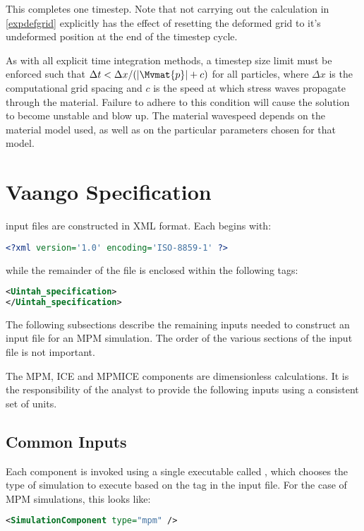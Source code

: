This completes one timestep.  Note that not carrying out the 
calculation in \ref{expdefgrid} explicitly has the effect of resetting the 
deformed grid to it's undeformed position at the end of the timestep cycle.

As with all explicit time integration methods, a timestep size limit must
be enforced such that $\Delta t < \Delta x/(|\Mvmat{p}| + c)$ for all 
particles, where $\Delta x$ is the computational grid spacing and $c$ 
is the speed at which stress waves propagate through the material.
Failure to adhere to this condition will cause the solution to become
unstable and blow up.  The material wavespeed depends on the 
material model used, as well as on the particular parameters
chosen for that model.  

\section{Vaango Specification} \label{Sec:UintahSpecMPM}
\Vaango input files are constructed in XML format.  Each begins with:
\begin{lstlisting}[language=XML]
<?xml version='1.0' encoding='ISO-8859-1' ?>
\end{lstlisting}
while the remainder of the file is enclosed within the following tags:
\begin{lstlisting}[language=XML]
<Uintah_specification>
</Uintah_specification>
\end{lstlisting}

The following subsections describe the remaining inputs needed to construct
an input file for an MPM simulation.  The order of the various sections 
of the input file is not important.  
\begin{WarningBox}
The MPM, ICE and MPMICE components
are dimensionless calculations.  It is the responsibility of the analyst
to provide the following inputs using a consistent set of units.
\end{WarningBox}

\subsection{Common Inputs} \label{Sec:commonInputs}
Each \Vaango component is invoked using a single executable called
, which chooses the type of simulation
to execute based on the  tag in the
input file.  For the case of MPM simulations, this looks like:
\begin{lstlisting}[language=XML]
 <SimulationComponent type="mpm" />
\end{lstlisting}

